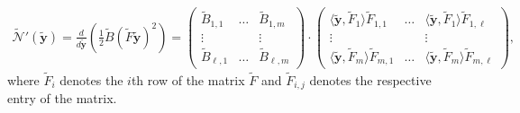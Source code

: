 \begin{align*}
\tilde{\mathcal{N}}'(\mathbf{\tilde{y}}) = \frac{d}{d \mathbf{\tilde{y}}} \left( \frac{1}{2} \tilde{B} (\tilde{F}\mathbf{\tilde{y}})^2 \right) = \begin{pmatrix} \tilde{B}_{1,1} & \hdots & \tilde{B}_{1,m}\\ \vdots & & \vdots \\ \tilde{B}_{\ell,1} & \hdots & \tilde{B}_{\ell,m}  \end{pmatrix} \cdot \begin{pmatrix} \mathbf{\langle \tilde{y}} , \tilde{F}_1\rangle \tilde{F}_{1,1} & \hdots & \langle \mathbf{\tilde{y}} , \tilde{F}_1 \rangle \tilde{F}_{1,\ell} \\ \vdots & & \vdots \\ \langle \mathbf{\tilde{y}} , \tilde{F}_m \rangle \tilde{F}_{m,1} & \hdots & \langle \mathbf{\tilde{y}} , \tilde{F}_m \rangle \tilde{F}_{m,\ell}  \end{pmatrix},
\end{align*}
where $\tilde{F}_i$ denotes the $i$th row of the matrix $\tilde{F}$ and $\tilde{F}_{i,j}$ denotes the respective entry of the matrix.

